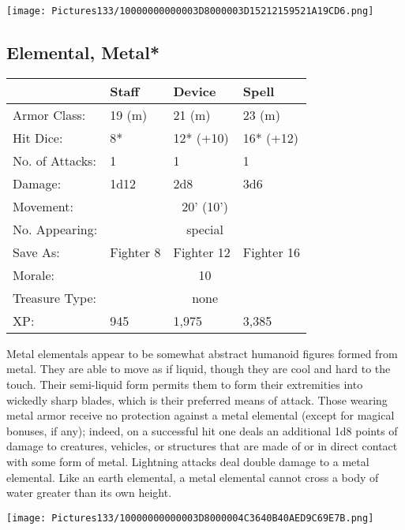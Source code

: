 \documentclass[a4paper,twoside,openany,10pt]{book}
\begin{document}
\begin{multicols}{2}
\begin{center}
	\texttt{[image: Pictures133/10000000000003D8000003D15212159521A19CD6.png]}
\end{center}


\subsection*{Elemental, Metal*}\label{elemental-metal}

\begin{tabularx}{0.48\textwidth}{@{}lllX@{}}
& Staff & Device & Spell \\\hline
Armor Class: & 19 (m) & 21 (m) & 23 (m) \\\hline
Hit Dice: & 8* & 12* (+10) & 16* (+12) \\\hline
No. of Attacks: & 1 & 1 & 1 \\\hline
Damage: & 1d12 & 2d8 & 3d6 \\\hline
Movement:  & \multicolumn{3}{c}{20' (10')}\\\hline
No. Appearing: &\multicolumn{3}{c}{special} \\\hline
Save As: & Fighter 8 & Fighter 12 & Fighter 16 \\\hline
Morale: & \multicolumn{3}{c}{10} \\\hline
Treasure Type: & \multicolumn{3}{c}{none} \\\hline
XP: & 945 & 1,975 & 3,385 \\\hline
\end{tabularx}\medskip

Metal elementals appear to be somewhat abstract humanoid figures formed from metal. They are able to move as if liquid, though they are cool and hard to the touch. Their semi-liquid form permits them to form their extremities into wickedly sharp blades, which is their preferred means of attack. Those wearing metal armor receive no protection against a metal elemental (except for magical bonuses, if any); indeed, on a successful hit one deals an additional 1d8 points of damage to creatures, vehicles, or structures that are made of or in direct contact with some form of metal. Lightning attacks deal double damage to a metal elemental. Like an earth elemental, a metal elemental cannot cross a body of water greater than its own height.

\begin{center}
	\texttt{[image: Pictures133/10000000000003D8000004C3640B40AED9C69E7B.png]}
\end{center}


\end{multicols}
\end{document}
